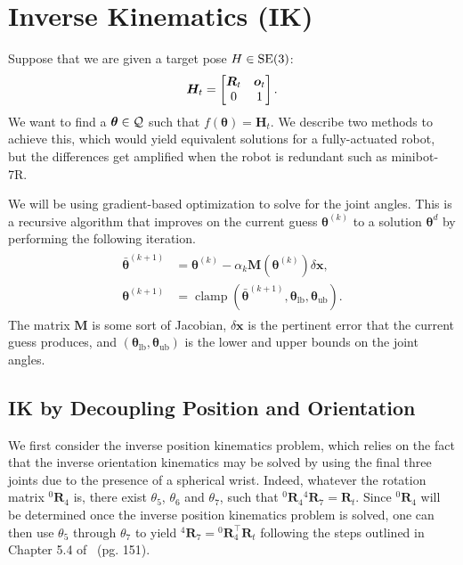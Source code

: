 \section{Inverse Kinematics (IK)}
\label{sec:inversekin}
% 
Suppose that we are given a target pose $H \in \mathrm{SE}(3)$: 
\[ \bm{H}_t = \begin{bmatrix}\bm{R}_t & \bm{o}_t \\ 0 & 1\end{bmatrix}. \]
We want to find a $\bm{\theta} \in \mathcal{Q}$ such that $f(\bm{\theta}) = \bm{H}_t$. We
describe two methods to achieve this, which would yield equivalent solutions for
a fully-actuated robot, but the differences get amplified when the robot is
redundant such as minibot-7R.

We will be using gradient-based optimization to solve for the joint angles. This
is a recursive algorithm that improves on the current guess $\bm{\theta}^{(k)}$
to a solution $\bm{\theta}^d$ by performing the following iteration.
%
\begin{align}
  \begin{split}
  \bar{\bm{\theta}}^{(k+1)} &= \bm{\theta}^{(k)} - \alpha_k \bm{M}\left(\bm{\theta}^{(k)}\right)\delta \bm{x}, \\
  \bm{\theta}^{(k+1)} &= \operatorname{clamp}\left(\bar{\bm{\theta}}^{(k+1)}, \bm{\theta}_{\text{lb}}, \bm{\theta}_{\text{ub}} \right).
  \end{split}
  \label{eq:gd}
\end{align}
%
The matrix $\bm{M}$ is some sort of Jacobian, $\delta \bm{x}$ is the pertinent 
error that the current guess produces, and $(\bm{\theta}_{\text{lb}},
\bm{\theta}_{\text{ub}})$ is the lower and upper bounds on the joint angles.

\subsection{IK by Decoupling Position and Orientation}
\label{ssec:ik_decoupling}

We first consider the inverse position kinematics problem, 
which relies on the fact that the inverse orientation kinematics may be solved
by using the final three joints due to the presence of a spherical wrist.
Indeed, whatever the 
rotation matrix $^0\bm{R}_4$ is, there exist $\theta_5$, $\theta_6$ and
$\theta_7$, such that ${}^0\bm{R}_4 {}^4\bm{R}_7 = \bm{R}_t$. Since
${}^0\bm{R}_4$ will be determined once the inverse position kinematics problem
is solved, one can then use $\theta_5$ through $\theta_7$ to yield ${}^4\bm{R}_7
= {}^0\bm{R}_4^\top\bm{R}_t$ following the steps outlined in Chapter 5.4
of~\cite{spong2020robot} (pg. 151).

